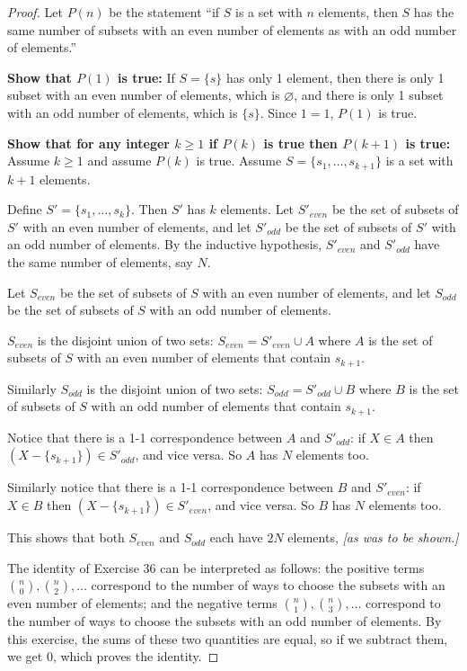 \documentclass[14pt]{extarticle}
\newcommand{\es}{\varnothing}
\begin{document}
\begin{proof}
     Let \(P(n)\) be the statement ``if \(S\) is a set with \(n\) elements, then \(S\) has the same number of subsets with an
     even number of elements as with an odd number of elements.''

     {\bf Show that \(P(1)\) is true:} If \(S = \{s\}\) has only 1 element, then there is only 1 subset with an even number of
     elements, which is \(\es\), and there is only 1 subset with an odd number of elements, which is \(\{s\}\). Since \(1=1\),
     \(P(1)\) is true.

          {\bf Show that for any integer \(k \geq 1\) if \(P(k)\) is true then \(P(k+1)\) is true:} Assume \(k \geq 1\) and assume
     \(P(k)\) is true. Assume \(S = \{s_1, \ldots, s_{k+1}\}\) is a set with \(k+1\) elements.

     Define \(S' = \{s_1, \ldots, s_k\}\). Then \(S'\) has \(k\) elements. Let \(S'_{even}\) be the set of subsets of \(S'\)
     with an even number of elements, and let \(S'_{odd}\) be the set of subsets of \(S'\) with an odd number of elements. By
     the inductive hypothesis, \(S'_{even}\) and \(S'_{odd}\) have the same number of elements, say \(N\).

     Let \(S_{even}\) be the set of subsets of \(S\) with an even number of elements, and let \(S_{odd}\) be the set of subsets
     of \(S\) with an odd number of elements.

     \(S_{even}\) is the disjoint union of two sets: \(S_{even} = S'_{even} \cup A\) where \(A\) is the set of subsets of \(S\) with an even number of elements that contain \(s_{k+1}\).

     Similarly \(S_{odd}\) is the disjoint union of two sets: \(S_{odd} = S'_{odd} \cup B\) where \(B\) is the set of subsets
     of \(S\) with an odd number of elements that contain \(s_{k+1}\).

     Notice that there is a 1-1 correspondence between \(A\) and \(S'_{odd}\): if \(X \in A\) then \((X - \{s_{k+1}\}) \in
     S'_{odd}\), and vice versa. So \(A\) has \(N\) elements too.

     Similarly notice that there is a 1-1 correspondence between \(B\) and \(S'_{even}\): if \(X \in B\) then \((X - \{s_{k+1}\}) \in S'_{even}\), and vice versa. So \(B\) has \(N\) elements too.

     This shows that both \(S_{even}\) and \(S_{odd}\) each have \(2N\) elements, {\it [as was to be shown.]}

     The identity of Exercise 36 can be interpreted as follows: the positive terms \(\binom{n}{0},\binom{n}{2},\ldots\) correspond
     to the number of ways to choose the subsets with an even number of elements; and the negative terms \(\binom{n}{1},
     \binom{n}{3}, \ldots\) correspond to the number of ways to choose the subsets with an odd number of elements. By this
     exercise, the sums of these two quantities are equal, so if we subtract them, we get 0, which proves the identity.
\end{proof}
\end{document}
